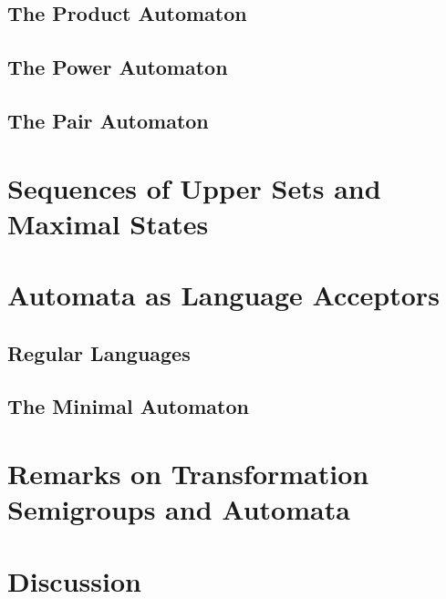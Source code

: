 

\subsection{The Product Automaton} 
\label{prelim:sec:productaut} 



\subsection{The Power Automaton} 
\label{prelim:sec:aut:power}



\subsection{The Pair Automaton}
\label{sec:pair_aut}



\section{Sequences of Upper Sets and Maximal States}
\label{prelim:sec:aut:sequppersets}



\section{Automata as Language Acceptors} 
\label{prelim:sec:autacceptors}

\subsection{Regular Languages}
\label{prelim:sec:regularlang}



\subsection{The Minimal Automaton}
\label{prelim:subsubsec:min_aut}



\section{Remarks on Transformation Semigroups and Automata}
\label{prelim:remarks_trans_semigrp_semiautomata}



\section{Discussion} 
\label{prelim:automata:discussion}

 